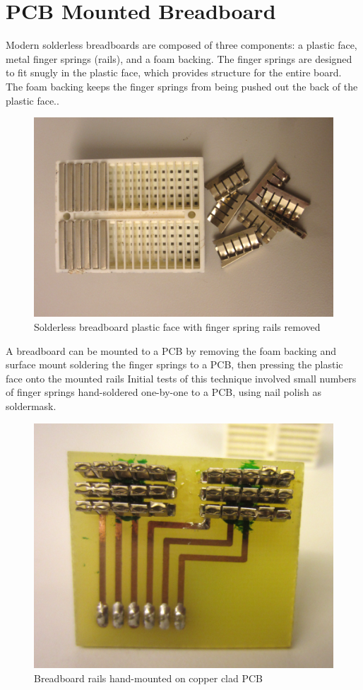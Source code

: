 \documentclass[11pt,twoside]{mitthesis}
\begin{document}
\section{PCB Mounted Breadboard}

Modern solderless breadboards are composed of three components: a plastic face, metal finger springs (rails), and a foam backing.
The finger springs are designed to fit snugly in the plastic face, which provides structure for the entire board.
The foam backing keeps the finger springs from being pushed out the back of the plastic face..

\begin{figure}[h!]
  \begin{center}
      \includegraphics[width=.55\textwidth]{../bb-rails2.png}
      \caption{Solderless breadboard plastic face with finger spring rails removed}
  \end{center}
\end{figure}

A breadboard can be mounted to a PCB by removing the foam backing and surface mount soldering the finger springs to a PCB, then pressing the plastic face onto the mounted rails
Initial tests of this technique involved small numbers of finger springs hand-soldered one-by-one to a PCB, using nail polish as soldermask.

\begin{figure}[H]
  \begin{center}
      \includegraphics[width=.55\textwidth]{../bb-proto-1.png}
      \caption{Breadboard rails hand-mounted on copper clad PCB}
  \end{center}
\end{figure}
\end{document}

